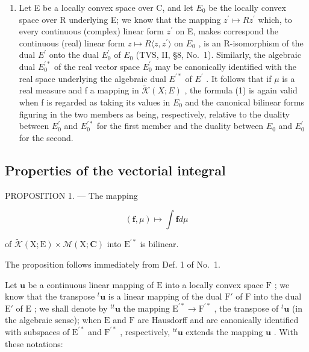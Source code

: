 \begin{enumerate}
\def\labelenumi{\arabic{enumi})}
\setcounter{enumi}{1}
\tightlist
\item
  Let E be a locally convex space over C, and let \(E_{0}\) be the locally convex space over R underlying E; we know that the mapping \(z^{\prime} \mapsto Rz^{\prime}\) which, to every continuous (complex) linear form \(z^{\prime}\) on E, makes correspond the continuous (real) linear form \(z \mapsto R\langle z, z^{\prime} \rangle\) on \(E_{0}\) , is an R-isomorphism of the dual \(E^{\prime}\) onto the dual \(E_{0}^{\prime}\) of \(E_{0}\) (TVS, II, §8, No.~1). Similarly, the algebraic dual \(E_{0}^{\prime *}\) of the real vector space \(E_{0}^{\prime}\) may be canonically identified with the real space underlying the algebraic dual \(E^{\prime *}\) of \(E^{\prime}\) . It follows that if \(\mu\) is a real measure and f a mapping in \(\widetilde{\mathcal{K}}(X;E)\) , the formula (1) is again valid when f is regarded as taking its values in \(E_{0}\) and the canonical bilinear forms figuring in the two members as being, respectively, relative to the duality between \(E_{0}^{\prime}\) and \(E_{0}^{\prime *}\) for the first member and the duality between \(E_{0}\) and \(E_{0}^{\prime}\) for the second.
\end{enumerate}

\subsection{Properties of the vectorial integral}

PROPOSITION 1. --- The mapping

\[
(\mathbf {f}, \mu) \mapsto \int \mathbf {f} d \mu
\]

of \(\widetilde{\mathcal{K}} (\mathrm{X};\mathrm{E})\times \mathcal{M}(\mathrm{X};\mathbf{C})\) into \(\mathrm{E}^{\prime *}\) is bilinear.

The proposition follows immediately from Def. 1 of No.~1.

Let \(\mathbf{u}\) be a continuous linear mapping of \(\mathrm{E}\) into a locally convex space \(\mathrm{F}\) ; we know that the transpose \(^t\mathbf{u}\) is a linear mapping of the dual \(\mathrm{F}'\) of \(\mathrm{F}\) into the dual \(\mathrm{E}'\) of \(\mathrm{E}\) ; we shall denote by \(^{tt}\mathbf{u}\) the mapping \(\mathrm{E}^{\prime *} \to \mathrm{F}^{\prime *}\) , the transpose of \(^t\mathbf{u}\) (in the algebraic sense); when \(\mathrm{E}\) and \(\mathrm{F}\) are Hausdorff and are canonically identified with subspaces of \(\mathrm{E}^{\prime *}\) and \(\mathrm{F}^{\prime *}\) , respectively, \(^{tt}\mathbf{u}\) extends the mapping \(\mathbf{u}\) . With these notations:

